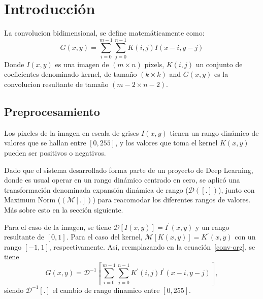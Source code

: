 \chapter{Introducción}\label{intro_secc}

La convolucion bidimensional, se define matemáticamente como:
\begin{equation}\label{conv-org}
  G(x,y) = \sum_{i=0}^{m-1} \sum_{j=0}^{n-1}K(i,j)I(x-i,y-j)
\end{equation}
Donde $I(x,y)$ es una imagen de $(m \times n)$ pixels, $K(i,j)$ un conjunto de
coeficientes denominado kernel, de tamaño $(k \times k)$ and $G(x,y)$ es la
convolucion resultante de tamaño  $(m-2 \times n-2)$.

\section{Preprocesamiento}\label{dynamicrange}

Los pixeles de la imagen en escala de grises $I(x,y)$ tienen un rango dinámico
de valores que se hallan entre $[0,255]$, y los valores que toma el kernel
$K(x,y)$ pueden ser positivos o negativos.

Dado que el sistema desarrollado forma parte de un proyecto de Deep Learning,
donde es usual operar en un rango dinámico centrado en cero, se aplicó una
transformación denominada  expansión dinámica de rango\cite{dinamic_rango} ($\mathcal{D}([.])$),
junto con Maximum Norm\cite{max_norm} ($(\mathcal{M}[.])$) para reacomodar los diferentes 
rangos de valores. Más sobre esto en la sección siguiente.

Para el caso de la imagen, se tiene $\mathcal{D}[I(x,y)]=I^\prime(x,y)$ y un
rango resultante de $[0,1]$. Para el caso del kernel,
$\mathcal{M}[K(x,y)]=K^\prime(x,y)$ con un rango $[-1,1]$, respectivamente.
Así, reemplazando en la ecuación~\ref{conv-org}, se tiene 
\begin{equation}\label{conv-org1}
  G(x,y) = \mathcal{D}^{-1}\left[\sum_{i=0}^{m-1} \sum_{j=0}^{n-1}K^\prime(i,j)I^\prime(x-i,y-j)\right],
\end{equation}
siendo $\mathcal{D}^{-1}[.]$ el cambio de rango dinamico entre $[0,255]$.

